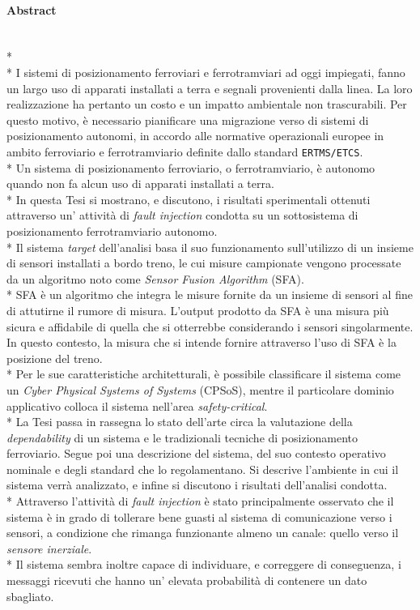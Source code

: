 \paragraph{Abstract}\mbox{}\\*\\*
I sistemi di posizionamento ferroviari e ferrotramviari ad oggi impiegati, fanno un largo uso di apparati installati a terra e segnali provenienti dalla linea. La loro realizzazione ha pertanto un costo e un impatto ambientale non trascurabili. Per questo motivo, \`e necessario pianificare una migrazione verso di sistemi di posizionamento autonomi, in accordo alle normative operazionali europee in ambito ferroviario e ferrotramviario definite dallo standard \texttt{ERTMS/ETCS}.\\*
Un sistema di posizionamento ferroviario, o ferrotramviario, \`e autonomo quando non fa alcun uso di apparati installati a terra.\\*
In questa Tesi si mostrano, e discutono, i risultati sperimentali ottenuti attraverso un' attivit\`a di \emph{fault injection} condotta su un sottosistema di posizionamento ferrotramviario autonomo.\\*
Il sistema \emph{target} dell'analisi basa il suo funzionamento sull'utilizzo di un insieme di sensori installati a bordo treno, le cui misure campionate vengono processate da un algoritmo noto come \emph{Sensor Fusion Algorithm} (SFA).\\*
SFA \`e un algoritmo che integra le misure fornite da un insieme di sensori al fine di attutirne il rumore di misura. L'output prodotto da SFA \`e una misura pi\`u sicura e affidabile di quella che si otterrebbe considerando i sensori singolarmente. In questo contesto, la misura che si intende fornire attraverso l'uso di SFA \`e la posizione del treno.\\*
Per le sue caratteristiche architetturali, \`e possibile classificare il sistema come un \emph{Cyber Physical Systems of Systems} (CPSoS), mentre il particolare dominio applicativo colloca il sistema nell'area \emph{safety-critical}.\\*
La Tesi passa in rassegna lo stato dell'arte circa la valutazione della \emph{dependability} di un sistema e le tradizionali tecniche di posizionamento ferroviario. Segue poi una descrizione del sistema, del suo contesto operativo nominale e degli standard che lo regolamentano. Si descrive l'ambiente in cui il sistema verr\`a analizzato, e infine si discutono i risultati dell'analisi condotta.\\*
Attraverso l'attivit\`a di \emph{fault injection} \`e stato principalmente osservato che il sistema \`e in grado di tollerare bene guasti al sistema di comunicazione verso i sensori, a condizione che rimanga funzionante almeno un canale: quello verso il \emph{sensore inerziale}.\\*
Il sistema sembra inoltre capace di individuare, e correggere di conseguenza, i messaggi ricevuti che hanno un' elevata probabilit\`a di contenere un dato sbagliato.
\begin{flushleft}
	
\end{flushleft}